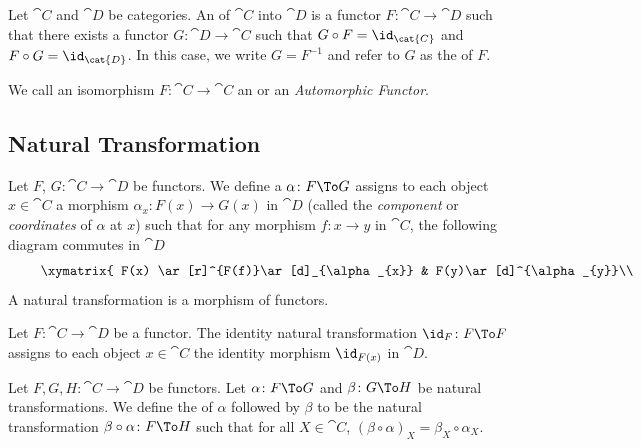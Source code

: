 \begin{definition}
Let $\cat{C}$ and $\cat{D}$ be categories.
An  of $\cat{C}$ into $\cat{D}$ is a functor
$F\colon\cat{C}\to\cat{D}$ such that there exists a functor
$G\colon\cat{D}\to\cat{C}$ such that $G\circ F=\id_{\cat{C}}$ and
$F\circ G=\id_{\cat{D}}$. In this case, we write $G=F^{-1}$ and refer
to $G$ as the  of $F$.

We call an isomorphism $F\colon\cat{C}\to\cat{C}$ an
 or an \emph{Automorphic Functor}.
\end{definition}

\subsection{Natural Transformation}

\begin{definition}
Let $F$, $G\colon\cat{C}\to\cat{D}$ be functors.
We define a  $\alpha\colon F\To G$
assigns to each object $x\in\cat{C}$ a morphism $\alpha_{x}\colon F(x)\to G(x)$
in $\cat{D}$ (called the \emph{component} or \emph{coordinates} of $\alpha$ at $x$) such
that for any morphism $f\colon x\to y$ in $\cat{C}$, the following
diagram commutes in $\cat{D}$
\begin{equation}
\vcenter{\xymatrix{
F(x) \ar[r]^{F(f)}\ar[d]_{\alpha_{x}} & F(y)\ar[d]^{\alpha_{y}}\\ 
G(x) \ar[r]_{G(f)} & G(y)
}}
\end{equation}
A natural transformation is a morphism of functors.
\end{definition}

\begin{example}
Let $F\colon\cat{C}\to\cat{D}$ be a functor. The identity natural
transformation $\id_{F}\colon F\To F$ assigns to each object
$x\in\cat{C}$ the identity morphism $\id_{F(x)}$ in $\cat{D}$.
\end{example}

\begin{definition}
Let $F,G,H\colon\cat{C}\to\cat{D}$ be functors.
Let $\alpha\colon F\To G$ and $\beta\colon G\To H$ be natural transformations.
We define the  of $\alpha$ followed by $\beta$ to
be the natural transformation $\beta\circ\alpha\colon F\To H$ such
that for all $X\in\cat{C}$, $(\beta\circ\alpha)_{X}=\beta_{X}\circ\alpha_{X}$.
\end{definition}

